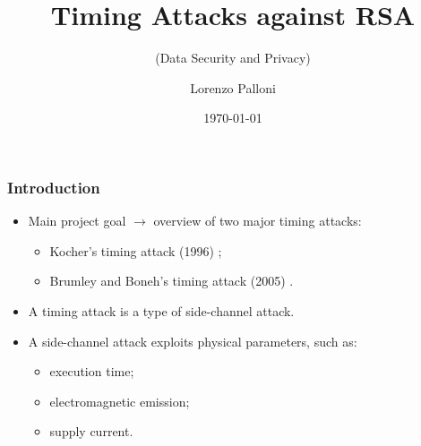 \documentclass{beamer}
\title[DSP - 2021/22 - Lorenzo Palloni]{Timing Attacks against RSA}
\subtitle{(Data Security and Privacy)}
\author{Lorenzo Palloni}
\institute[]{
  University of Florence\\
  \medskip
  \textit{lorenzo.palloni@stud.unifi.it}
}
\date{\today}
\begin{document}
\begin{frame}
\titlepage %
\end{frame}

\begin{frame}
\frametitle{Introduction}

\begin{itemize}
  \item Main project goal $\rightarrow$ overview of two major timing attacks:
  \begin{itemize}
    \item Kocher's timing attack (1996) \cite{bib:kocher};
    \item Brumley and Boneh's timing attack (2005) \cite{bib:openssl}.
  \end{itemize}
\end{itemize}

\begin{itemize}
  \item A timing attack is a type of side-channel attack.
  \item A side-channel attack exploits physical parameters, such as:
  \begin{itemize}
    \item execution time;
    \item electromagnetic emission;
    \item supply current.
  \end{itemize}
\end{itemize}

\end{frame}
\end{document}
